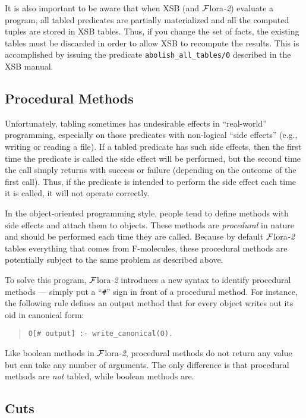 \documentclass[11pt]{article}
\newcommand{\FLORA}{{\mbox{${\cal F}${\sc lora}\rm\emph{-2}}}\xspace}
\begin{document}
It is also important to be aware that when XSB (and \FLORA) evaluate a program,
all tabled predicates are partially materialized and all the computed
tuples are stored in XSB tables. Thus, if you change the set of facts, the
existing tables must be discarded in order to allow XSB to recompute the
results. This is accomplished by issuing the predicate
{\tt abolish\_all\_tables/0} described in the XSB manual.


\subsection{Procedural Methods}


%
Unfortunately, tabling sometimes has undesirable effects in
``real-world'' programming, especially on those predicates with
non-logical ``side effects'' (e.g., writing or reading a file).  If a
tabled predicate has such side effects, then the first time the predicate
is called the side effect will be performed, but the second time the call
simply returns with success or failure (depending on the outcome of the
first call).  Thus, if the predicate is intended to perform the side
effect each time it is called, it will not operate correctly.

In the object-oriented programming style, people tend to define
methods with side effects and attach them to objects. These methods
are \emph{procedural} in nature and should be performed each time they
are called. Because by default \FLORA tables everything that comes
from F-molecules, these procedural methods are potentially subject to
the same problem as described above.

To solve this program, \FLORA introduces a new syntax to identify
procedural methods --- simply put a ``\verb|#|'' sign in front of a
procedural method. For instance, the following rule defines an
output method that for every object writes out its oid in canonical
form:
\begin{quote}
\verb|O[# output] :- write_canonical(O).|
\end{quote}

Like boolean methods in \FLORA, procedural methods do not return any
value but can take any number of arguments. The only difference is that
procedural methods are \emph{not} tabled, while boolean methods are.


\subsection{Cuts}
\end{document}
